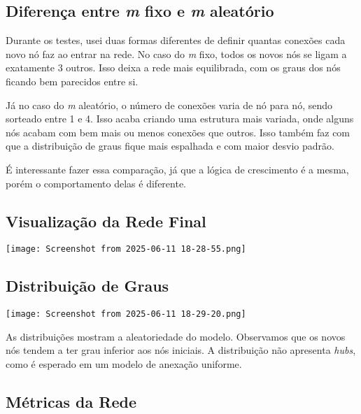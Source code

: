 \documentclass[a4paper]{article}
\begin{document}
\subsection*{Diferença entre \textit{m} fixo e \textit{m} aleatório}

Durante os testes, usei duas formas diferentes de definir quantas conexões cada novo nó faz ao entrar na rede. No caso do \textit{m} fixo, todos os novos nós se ligam a exatamente 3 outros. Isso deixa a rede mais equilibrada, com os graus dos nós ficando bem parecidos entre si.

Já no caso do \textit{m} aleatório, o número de conexões varia de nó para nó, sendo sorteado entre 1 e 4. Isso acaba criando uma estrutura mais variada, onde alguns nós acabam com bem mais ou menos conexões que outros. Isso também faz com que a distribuição de graus fique mais espalhada e com maior desvio padrão.

É interessante fazer essa comparação, já que a lógica de crescimento é a mesma, porém o comportamento delas é diferente.

\vspace{0.5cm}

\subsection*{Visualização da Rede Final}

\begin{center}
    \texttt{[image: Screenshot from 2025-06-11 18-28-55.png]}
\end{center}

\vspace{0.5cm}

\subsection*{Distribuição de Graus}

\begin{center}
    \texttt{[image: Screenshot from 2025-06-11 18-29-20.png]}
\end{center}

As distribuições mostram a aleatoriedade do modelo. Observamos que os novos nós tendem a ter grau inferior aos nós iniciais. A distribuição não apresenta \textit{hubs}, como é esperado em um modelo de anexação uniforme.

\subsection*{Métricas da Rede}
\end{document}
